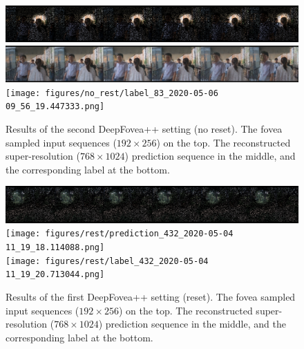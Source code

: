 \documentclass[10pt,twocolumn,letterpaper]{article}
\begin{document}
	\begin{figure}[htbp!]
		\centering
		\includegraphics[width=\columnwidth]{figures/no_rest/input_83_2020-05-06 09_56_21.383738.png}\\\vspace{-0.1cm}
		\includegraphics[width=\columnwidth]{figures/no_rest/prediction_83_2020-05-06 09_56_17.234900.png}\\\vspace{-0.1cm}
		\texttt{[image: figures/no\_rest/label\_83\_2020-05-06 09\_56\_19.447333.png]}\\
		\caption{Results of the second DeepFovea++ setting (no reset). The fovea sampled input sequences ($192 \times 256$) on the top. The reconstructed super-resolution ($768 \times 1024$) prediction sequence in the middle, and the corresponding label at the bottom.}
		\label{fig:norestresults1}
	\end{figure}
	
	\begin{figure}[htbp!]
		\centering
		\includegraphics[width=\columnwidth]{figures/rest/input_432_2020-05-04 11_19_22.304534.png}\\\vspace{-0.1cm}
		\texttt{[image: figures/rest/prediction\_432\_2020-05-04 11\_19\_18.114088.png]}\\\vspace{-0.1cm}
		\texttt{[image: figures/rest/label\_432\_2020-05-04 11\_19\_20.713044.png]}\\
		\caption{Results of the first DeepFovea++ setting (reset). The fovea sampled input sequences ($192 \times 256$) on the top. The reconstructed super-resolution ($768 \times 1024$) prediction sequence in the middle, and the corresponding label at the bottom.}
		\label{fig:restresults2}
	\end{figure}
	
\end{document}
